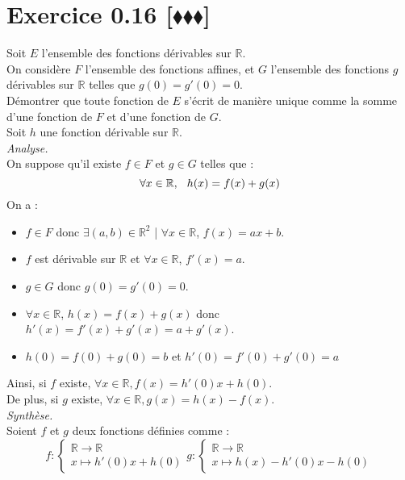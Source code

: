 \documentclass[10pt]{article}
\begin{document}
\section*{Exercice 0.16 [$\blacklozenge\blacklozenge\blacklozenge$]}
\begin{tcolorbox}[enhanced, width=6in, center, size=fbox, fontupper=\large, drop shadow southwest]
    Soit $E$ l'ensemble des fonctions dérivables sur $\mathbb{R}$.\\
    On considère $F$ l'ensemble des fonctions affines, et $G$ l'ensemble des fonctions $g$ dérivables sur $\mathbb{R}$ telles que $g(0)=g'(0)=0$.\\
    Démontrer que toute fonction de $E$ s'écrit de manière unique comme la somme d'une fonction de $F$ et d'une fonction de $G$.\\[0.5cm]
    Soit $h$ une fonction dérivable sur $\mathbb{R}$.\\
    \emph{Analyse.}\\
    On suppose qu'il existe $f\in F$ et $g\in G$ telles que :
    \begin{equation*}
        \forall{x\in\mathbb{R}}, \hspace{0.25cm} h(x)=f(x)+g(x)
    \end{equation*}
    On a :
    \begin{itemize}
        \item $f\in F$ donc $\exists(a,b)\in\mathbb{R}^2$ | $\forall{x\in\mathbb{R}}$, $f(x)=ax+b$.
        \item $f$ est dérivable sur $\mathbb{R}$ et $\forall{x\in\mathbb{R}}$, $f'(x)=a$.
        \item $g\in G$ donc $g(0)=g'(0)=0$.  
        \item $\forall{x\in\mathbb{R}}$, $h(x)=f(x)+g(x)$ donc $h'(x)=f'(x)+g'(x)=a+g'(x)$.
        \item $h(0)=f(0)+g(0)=b$ et $h'(0)=f'(0)+g'(0)=a$
    \end{itemize}
    Ainsi, si $f$ existe, $\forall{x\in\mathbb{R}}, f(x) = h'(0)x+h(0)$.\\
    De plus, si $g$ existe, $\forall{x\in\mathbb{R}}, g(x) = h(x)-f(x)$.\\[0.5cm]
    \emph{Synthèse.}\\
    Soient $f$ et $g$ deux fonctions définies comme :
    \begin{equation*}
        f:\begin{cases}\mathbb{R}\rightarrow\mathbb{R}\\x\mapsto h'(0)x+h(0)\end{cases} g:\begin{cases}\mathbb{R}\rightarrow\mathbb{R}\\x\mapsto h(x)-h'(0)x-h(0)\end{cases}

\end{equation*}
\end{tcolorbox}
\end{document}

